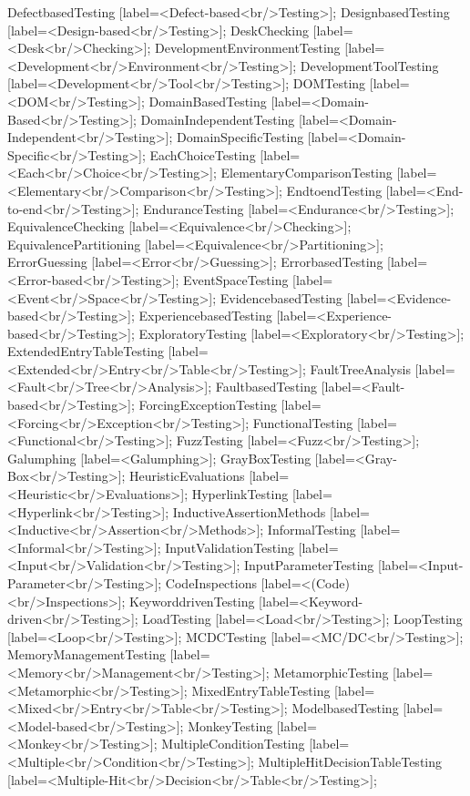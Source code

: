 \documentclass{article}
\begin{document}
{DefectbasedTesting [label=<Defect-based<br/>Testing>];
DesignbasedTesting [label=<Design-based<br/>Testing>];
DeskChecking [label=<Desk<br/>Checking>];
DevelopmentEnvironmentTesting [label=<Development<br/>Environment<br/>Testing>];
DevelopmentToolTesting [label=<Development<br/>Tool<br/>Testing>];
DOMTesting [label=<DOM<br/>Testing>];
DomainBasedTesting [label=<Domain-Based<br/>Testing>];
DomainIndependentTesting [label=<Domain-Independent<br/>Testing>];
DomainSpecificTesting [label=<Domain-Specific<br/>Testing>];
EachChoiceTesting [label=<Each<br/>Choice<br/>Testing>];
ElementaryComparisonTesting [label=<Elementary<br/>Comparison<br/>Testing>];
EndtoendTesting [label=<End-to-end<br/>Testing>];
EnduranceTesting [label=<Endurance<br/>Testing>];
EquivalenceChecking [label=<Equivalence<br/>Checking>];
EquivalencePartitioning [label=<Equivalence<br/>Partitioning>];
ErrorGuessing [label=<Error<br/>Guessing>];
ErrorbasedTesting [label=<Error-based<br/>Testing>];
EventSpaceTesting [label=<Event<br/>Space<br/>Testing>];
EvidencebasedTesting [label=<Evidence-based<br/>Testing>];
ExperiencebasedTesting [label=<Experience-based<br/>Testing>];
ExploratoryTesting [label=<Exploratory<br/>Testing>];
ExtendedEntryTableTesting [label=<Extended<br/>Entry<br/>Table<br/>Testing>];
FaultTreeAnalysis [label=<Fault<br/>Tree<br/>Analysis>];
FaultbasedTesting [label=<Fault-based<br/>Testing>];
ForcingExceptionTesting [label=<Forcing<br/>Exception<br/>Testing>];
FunctionalTesting [label=<Functional<br/>Testing>];
FuzzTesting [label=<Fuzz<br/>Testing>];
Galumphing [label=<Galumphing>];
GrayBoxTesting [label=<Gray-Box<br/>Testing>];
HeuristicEvaluations [label=<Heuristic<br/>Evaluations>];
HyperlinkTesting [label=<Hyperlink<br/>Testing>];
InductiveAssertionMethods [label=<Inductive<br/>Assertion<br/>Methods>];
InformalTesting [label=<Informal<br/>Testing>];
InputValidationTesting [label=<Input<br/>Validation<br/>Testing>];
InputParameterTesting [label=<Input-Parameter<br/>Testing>];
CodeInspections [label=<(Code)<br/>Inspections>];
KeyworddrivenTesting [label=<Keyword-driven<br/>Testing>];
LoadTesting [label=<Load<br/>Testing>];
LoopTesting [label=<Loop<br/>Testing>];
MCDCTesting [label=<MC/DC<br/>Testing>];
MemoryManagementTesting [label=<Memory<br/>Management<br/>Testing>];
MetamorphicTesting [label=<Metamorphic<br/>Testing>];
MixedEntryTableTesting [label=<Mixed<br/>Entry<br/>Table<br/>Testing>];
ModelbasedTesting [label=<Model-based<br/>Testing>];
MonkeyTesting [label=<Monkey<br/>Testing>];
MultipleConditionTesting [label=<Multiple<br/>Condition<br/>Testing>];
MultipleHitDecisionTableTesting [label=<Multiple-Hit<br/>Decision<br/>Table<br/>Testing>];
}
\end{document}
